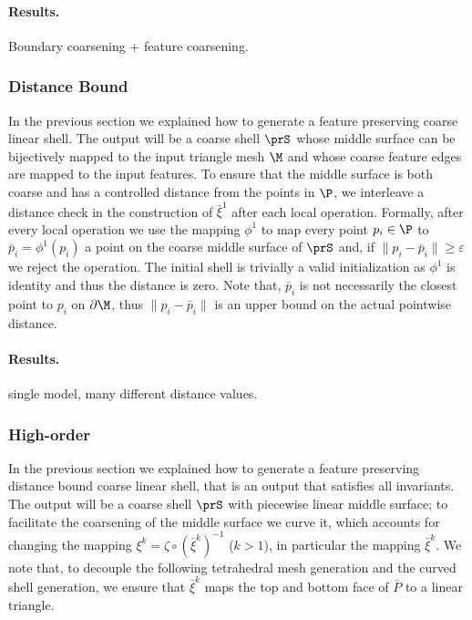 \paragraph{Results.} 
Boundary coarsening + feature coarsening.

\subsubsection{Distance Bound}\label{cumin:sec:distance}

In the previous section we explained how to generate a feature preserving coarse linear shell. The output will be a coarse shell $\prS$ whose middle surface can be bijectively mapped to the input triangle mesh $\M$ and whose coarse feature edges are mapped to the input features. To ensure that the middle surface is both coarse and has a controlled distance from the points in $\P$, we interleave a distance check in the construction of $\bar\xi^1$ after each local operation. Formally, after every local operation we use the mapping $\phi^1$ to map every point $p_i\in\P$ to $\bar p_i = \phi^1(p_i)$ a point on the coarse middle surface of $\prS$ and, if $\|p_i-\bar p_i\| \geq \varepsilon$ we reject the operation. The initial shell is trivially a valid initialization as $\phi^1$ is identity and thus the distance is zero. Note that, $\bar p_i$ is not necessarily the closest point to $p_i$ on $\partial\M$, thus $\|p_i-\bar p_i\|$ is an upper bound on the actual pointwise distance.   


\paragraph{Results.} 
single model, many different distance values.


\subsubsection{High-order}\label{cumin:sec:high-order}
In the previous section we explained how to generate a feature preserving distance bound coarse linear shell, that is an output that satisfies all invariants. The output will be a coarse shell $\prS$ with piecewise linear middle surface; to facilitate the coarsening of the middle surface we curve it, which accounts for changing the mapping $\xi^k = \zeta\circ (\bar\xi^k)^{-1}$ ($k > 1$), in particular the mapping $\bar\xi^k$. We note that, to decouple the following tetrahedral mesh generation and the curved shell generation, we ensure that $\bar\xi^k$ maps the top and bottom face of $\bar P$ to a linear triangle.

